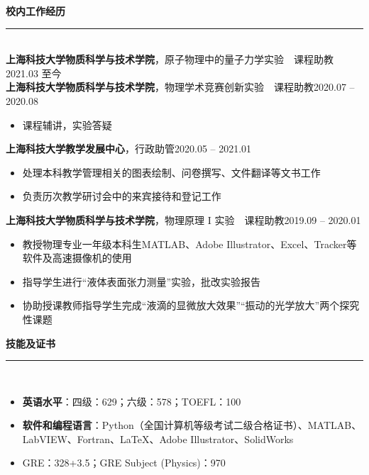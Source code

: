 \documentclass[letterpaper,11pt]{article}
\begin{document}
{\Large\bfseries{}校内工作经历}\\
\rule[1.5ex]{\columnwidth}{1pt}\\
{\songti\large\bfseries{}上海科技大学物质科学与技术学院}，{\large{}原子物理中的量子力学实验~~课程助教}\hfill{2021.03 至今}
\vspace{1ex}\\
{\songti\large\bfseries{}上海科技大学物质科学与技术学院}，{\large{}物理学术竞赛创新实验~~课程助教}\hfill{2020.07 -- 2020.08}\\
\vspace{-4ex}
\begin{itemize}
    \item 课程辅讲，实验答疑
\end{itemize}
{\songti\large\bfseries{}上海科技大学教学发展中心}，{\large{}行政助管}\hfill{2020.05 -- 2021.01}\\
\vspace{-4ex}
\begin{itemize}
    \item 处理本科教学管理相关的图表绘制、问卷撰写、文件翻译等文书工作
    \item 负责历次教学研讨会中的来宾接待和登记工作
\end{itemize}
{\songti\large\bfseries{}上海科技大学物质科学与技术学院}，{\large{}物理原理 I 实验~~课程助教}\hfill{2019.09 -- 2020.01}\\
\vspace{-4ex}
\begin{itemize}
    \item 教授物理专业一年级本科生MATLAB、Adobe Illustrator、Excel、Tracker等软件及高速摄像机的使用
    \item 指导学生进行“液体表面张力测量”实验，批改实验报告
    \item 协助授课教师指导学生完成“液滴的显微放大效果”“振动的光学放大”两个探究性课题
\end{itemize}
\vspace{1ex}

{\Large\bfseries{}技能及证书}\\
\rule[1.5ex]{\columnwidth}{1pt}\\
\vspace{-4ex}
\begin{itemize}
    \item \textbf{\songti\bfseries{}英语水平}：四级：629；六级：578；TOEFL：100
    \item {\songti\bfseries{}软件和编程语言}：Python（全国计算机等级考试二级合格证书）、MATLAB、LabVIEW、Fortran、\LaTeX、Adobe Illustrator、SolidWorks
    \item GRE：328+3.5；GRE Subject (Physics)：970
\end{itemize}
\end{document}
